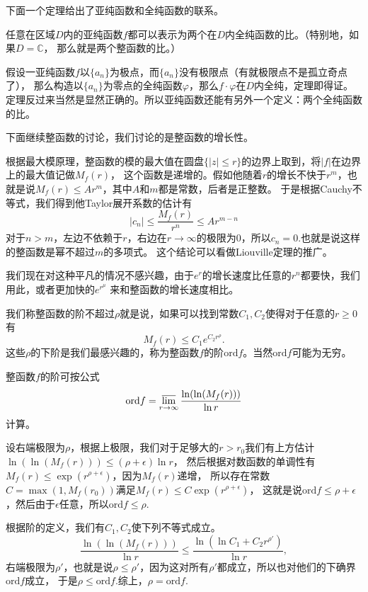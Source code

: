 下面一个定理给出了亚纯函数和全纯函数的联系。
\begin{thm}[Weierstrass]
任意在区域$D$内的亚纯函数$f$都可以表示为两个在$D$内全纯函数的比。（特别地，如果$D=\mathbb{C}$，
那么就是两个整函数的比。）
\end{thm}

假设一亚纯函数$f$以$\{a_n\}$为极点，而$\{a_n\}$没有极限点（有就极限点不是孤立奇点了），
那么构造以$\{a_n\}$为零点的全纯函数$\varphi$，那么$f\cdot \varphi$在$D$内全纯，定理即得证。
定理反过来当然是显然正确的。所以亚纯函数还能有另外一个定义：两个全纯函数的比。

下面继续整函数的讨论，我们讨论的是整函数的增长性。

根据最大模原理，整函数的模的最大值在圆盘$\{|z|\leq r\}$的边界上取到，将$|f|$在边界上的最大值记做$M_f(r)$，
这个函数是递增的。假如他随着$r$的增长不快于$r^m$，也就是说$M_f(r)\leq Ar^m$，其中$A$和$m$都是常数，后者是正整数。
于是根据Cauchy不等式，我们得到他Taylor展开系数的估计有
\[
|c_n|\leq \frac{M_f(r)}{r^n} \leq A r^{m-n}
\]
对于$n>m$，左边不依赖于$r$，右边在$r\to \infty $的极限为0，所以$c_n=0$.也就是说这样的整函数是幂不超过$m$的多项式。
这个结论可以看做Liouville定理的推广。

我们现在对这种平凡的情况不感兴趣，由于$e^r$的增长速度比任意的$r^n$都要快，我们用此，或者更加快的$e^{r^\mu}$
来和整函数的增长速度相比。

我们称整函数的阶不超过$\rho$就是说，如果可以找到常数$C_1,C_2$使得对于任意的$r\geq 0$有
\[
M_f(r)\leq C_1 e^{C_2r^\rho}.
\]
这些$\rho$的下阶是我们最感兴趣的，称为整函数$f$的阶$\mathrm{ord} f$。当然$\mathrm{ord} f$可能为无穷。
\begin{pro}
整函数$f$的阶可按公式
\[
\mathrm{ord} f = \varlimsup_{r\to \infty} \frac{\ln(\ln(M_f(r)))}{\ln r}
\]
计算。
\end{pro}

设右端极限为$\rho$，根据上极限，我们对于足够大的$r>r_0$我们有上方估计$\ln(\ln(M_f(r)))\leq (\rho +\epsilon)\ln r$，
然后根据对数函数的单调性有$M_f(r)\leq \exp(r^{\rho +\epsilon})$，因为$M_f(r)$递增，
所以存在常数$C=\max(1,M_f(r_0))$满足$M_f(r)\leq C\exp(r^{\rho +\epsilon})$，
这就是说$\mathrm{ord} f \leq \rho+ \epsilon$，然后由于$\epsilon$任意，所以$\mathrm{ord} f \leq \rho$.

根据阶的定义，我们有$C_1,C_2$使下列不等式成立。
\[
\frac{\ln(\ln(M_f(r)))}{\ln r}\leq \frac{\ln(\ln C_1+C_2 r^{\rho'})}{\ln r},
\]
右端极限为$\rho'$，也就是说$\rho \leq \rho'$，因为这对所有$\rho'$都成立，所以也对他们的下确界$\mathrm{ord} f$成立，
于是$\rho \leq \mathrm{ord} f$.综上，$\rho = \mathrm{ord} f$.


